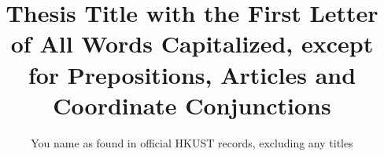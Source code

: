 \documentclass[a4paper]{ustthesis}
\title{Thesis Title with the First Letter of All Words Capitalized, except for Prepositions, Articles and Coordinate Conjunctions}  %
\author{You name as found in official HKUST records, excluding any titles}     %
\begin{document}



\maketitle

%

\dedication

\enddedication
\newpage

\end{document}
